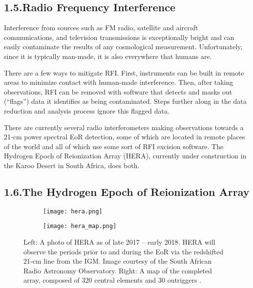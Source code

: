 \documentclass[12pt]{article}
\begin{document}
\tocless\subsection{\hypertarget{subsec:rfi}{1.5.\hspace{0.75em}Radio Frequency Interference}}

Interference from sources such as FM radio, satellite and aircraft communications, and television transmissions is exceptionally bright and can easily contaminate the results of any cosmological measurement. Unfortunately, since it is typically man-made, it is also everywhere that humans are.

There are a few ways to mitigate RFI. First, instruments can be built in remote areas to minimize contact with human-made interference. Then, after taking observations, RFI can be removed with software that detects and masks out (``flags'') data it identifies as being contaminated. Steps further along in the data reduction and analysis process ignore this flagged data.

There are currently several radio interferometers making observations towards a 21-cm power spectral EoR detection, some of which are located in remote places of the world and all of which use some sort of RFI excision software. The Hydrogen Epoch of Reionization Array (HERA), currently under construction in the Karoo Desert in South Africa, does both. \vspace{3mm}

\tocless\subsection{\hypertarget{subsec:hera}{1.6.\hspace{0.75em}The Hydrogen Epoch of Reionization Array}}

\begin{figure}[tb]
	\centering
	\begin{subfigure}{0.48\textwidth}
		\centering
		{\texttt{[image: hera.png]}}
	\end{subfigure} \hfill
	\begin{subfigure}{0.48\textwidth}
		\centering
		{\texttt{[image: hera\_map.png]}}
	\end{subfigure}
	\caption[The Hydrogen Epoch of Reionization Array]{Left: A photo of HERA as of late 2017 -- early 2018. HERA will observe the periods prior to and during the EoR via the redshifted 21-cm line from the IGM. Image courtesy of the South African Radio Astronomy Observatory. Right: A map of the completed array, composed of 320 central elements and 30 outriggers \citep{deboer2017}.}
	\label{fig:hera}
\end{figure}
\end{document}
